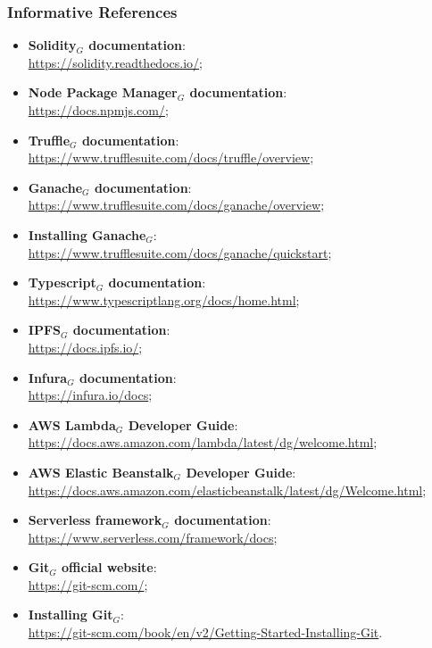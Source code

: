 		\subsubsection{Informative References}
			\begin{itemize}
				\item \textbf{Solidity$_{G}$ documentation}: \\
				\url{https://solidity.readthedocs.io/};
				
				\item \textbf{Node Package Manager$_{G}$ documentation}: \\
				\url{https://docs.npmjs.com/};
				
				\item \textbf{Truffle$_{G}$ documentation}: \\
				\url{https://www.trufflesuite.com/docs/truffle/overview};
				
				\item \textbf{Ganache$_{G}$ documentation}: \\
				\url{https://www.trufflesuite.com/docs/ganache/overview};
				
				\item \textbf{Installing Ganache$_{G}$}: \\
				\url{https://www.trufflesuite.com/docs/ganache/quickstart};
				
				\item \textbf{Typescript$_{G}$ documentation}: \\
				\url{https://www.typescriptlang.org/docs/home.html};
				
				\item \textbf{IPFS$_{G}$ documentation}: \\
				\url{https://docs.ipfs.io/};
				
				\item \textbf{Infura$_{G}$ documentation}: \\
				\url{https://infura.io/docs};
							
				\item \textbf{AWS Lambda$_{G}$ Developer Guide}: \\
				\url{https://docs.aws.amazon.com/lambda/latest/dg/welcome.html};
				
				\item \textbf{AWS Elastic Beanstalk$_{G}$ Developer Guide}: \\
				\url{https://docs.aws.amazon.com/elasticbeanstalk/latest/dg/Welcome.html};
				
				\item \textbf{Serverless framework$_{G}$ documentation}: \\
				\url{https://www.serverless.com/framework/docs};
				
				\item \textbf{Git$_{G}$ official website}: \\
				\url{https://git-scm.com/};
				
				\item \textbf{Installing Git$_{G}$}: \\
				\url{https://git-scm.com/book/en/v2/Getting-Started-Installing-Git}.
				
			\end{itemize}